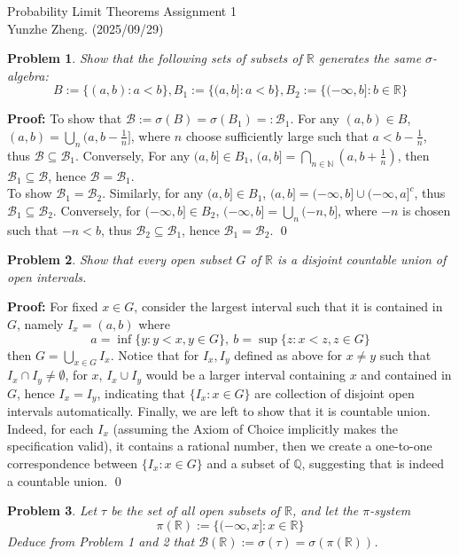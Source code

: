 \documentclass[12pt]{article}
\newtheorem{problem}{Problem}
\begin{document}
\noindent Probability Limit Theorems \hfill Assignment 1\\
Yunzhe Zheng. (2025/09/29)

\hrulefill

\begin{problem}
    Show that the following sets of subsets of $\mathbb{R}$ generates the same $\sigma$-algebra:
    $$
        B:=\{(a, b): a<b\}, B_1:=\{(a,b]: a<b\}, B_2:=
        \{(-\infty, b]: b\in\mathbb{R}\}
    $$
\end{problem}

\textbf{Proof:} To show that $\mathcal{B}:=\sigma(B)=\sigma(B_1)=:\mathcal{B}_1$. For any $(a,b)\in B$, $(a, b)=\bigcup_{n}(a, b-\frac{1}{n}]$, where $n$ choose sufficiently large such that $a<b-\frac{1}{n}$, thus $\mathcal{B}\subseteq\mathcal{B}_1$. Conversely, For any $(a,b]\in B_1$, $(a,b]=\bigcap_{n\in\mathbb{N}}\left(a, b+\frac{1}{n}\right)$, then $\mathcal{B}_1\subseteq\mathcal{B}$, hence $\mathcal{B}=\mathcal{B}_1$.\\ 
\indent To show $\mathcal{B}_1=\mathcal{B}_2$. Similarly, for any $(a,b]\in B_1$, $(a,b]=(-\infty, b]\cup(-\infty, a]^c$, thus $\mathcal{B}_1\subseteq\mathcal{B}_2$. Conversely, for $(-\infty, b]\in B_2$, $(-\infty, b]=\bigcup_n (-n, b]$, where $-n$ is chosen such that $-n<b$, thus $\mathcal{B}_2\subseteq\mathcal{B}_1$, hence $\mathcal{B}_1=\mathcal{B}_2$. \qed
\\
\begin{problem}
    Show that every open subset $G$ of $\mathbb{R}$ is a disjoint countable union of open intervals.
\end{problem}

\textbf{Proof:} For fixed $x\in G$, consider the largest interval such that it is contained in $G$, namely $I_x=(a, b)$ where 
$$
    a =\inf\{y: y<x, y\in G\}, \ b=\sup\{z: x<z,z\in G\}
$$ 
then $G=\bigcup_{x\in G}I_x$. Notice that for $I_x,I_y$ defined as above for $x\neq y$ such that $I_x\cap I_y\neq\emptyset$, for $x$, $I_x\cup I_y$ would be a larger interval containing $x$ and contained in $G$, hence $I_x=I_y$, indicating that $\{I_x: x\in G\}$ are collection of disjoint open intervals automatically. Finally, we are left to show that it is countable union. Indeed, for each $I_x$ (assuming the Axiom of Choice implicitly makes the specification valid), it contains a rational number, then we create a one-to-one correspondence between $\{I_x:x\in G\}$ and a subset of $\mathbb{Q}$, suggesting that is indeed a countable union. \qed
\\ 
\begin{problem}
    Let $\tau$ be the set of all open subsets of $\mathbb{R}$, and let the $\pi$-system
    $$
        \pi(\mathbb{R}):=\{(-\infty,x]: x\in\mathbb{R}\}
    $$ Deduce from Problem 1 and 2 that $\mathcal{B}(\mathbb{R}):=\sigma(\tau)=\sigma(\pi(\mathbb{R}))$.
\end{problem}
\end{document}
